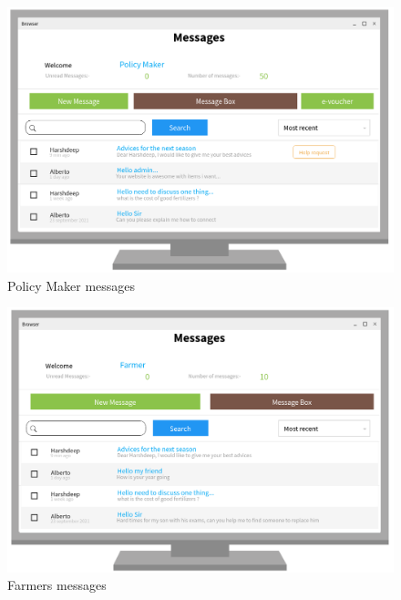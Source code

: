 \begin{figure}[H]
	
	\centering
	
	\includegraphics[width=0.8\columnwidth]{Images/messages_policy_maker.png}
	
	\caption{Policy Maker messages}
	
	\label{Fig:interface_messages_policy_maker}
	
\end{figure}

\begin{figure}[H]
	
	\centering
	
	\includegraphics[width=0.8\columnwidth]{Images/messages_farmers.png}
	
	\caption{Farmers messages}
	
	\label{Fig:interface_messages_farmers}
	
\end{figure}

